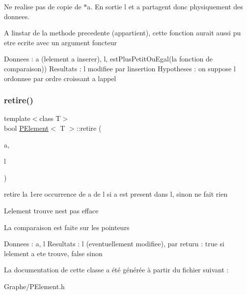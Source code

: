 Ne realise pas de copie de $\ast$a. En sortie l et a partagent donc physiquement des donnees.

A l\textquotesingle{}instar de la methode precedente (appartient), cette fonction aurait aussi pu etre ecrite avec un argument foncteur

Donnees \+: a (l\textquotesingle{}element a inserer), l, est\+Plus\+Petit\+Ou\+Egal(la fonction de comparaison)) Resultats \+: l modifiee par l\textquotesingle{}insertion Hypotheses \+: on suppose l ordonnee par ordre croissant a l\textquotesingle{}appel \mbox{\label{class_p_element_aa9bb67abf314148c1ecdb83e16c9c16d}} 
\subsubsection{\texorpdfstring{retire()}{retire()}}
{\footnotesize\ttfamily template$<$class T$>$ \\
bool \mbox{\hyperlink{class_p_element}{P\+Element}}$<$ T $>$\+::retire (\begin{DoxyParamCaption}\item[{const T $\ast$}]{a,  }\item[{\mbox{\hyperlink{class_p_element}{P\+Element}}$<$ T $>$ $\ast$\&}]{l }\end{DoxyParamCaption})\hspace{0.3cm}{\ttfamily [static]}}



retire la 1ere occurrence de a de l si a est present dans l, sinon ne fait rien 

L\textquotesingle{}element trouve n\textquotesingle{}est pas efface

La comparaison est faite sur les pointeurs

Donnees \+: a, l Resultats \+: l (eventuellement modifiee), par return \+: true si l\textquotesingle{}element a ete trouve, false sinon 

La documentation de cette classe a été générée à partir du fichier suivant \+:\begin{DoxyCompactItemize}
\item 
Graphe/P\+Element.\+h\end{DoxyCompactItemize}
